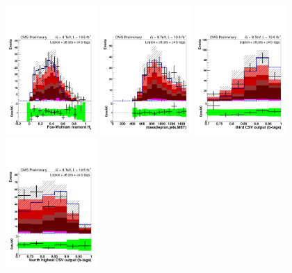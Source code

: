 \begin{figure}[hbtp]
 \begin{center}
   \includegraphics[width=0.31\textwidth]{Figures/Analysis_2_Diagrams/LJ_plots_lep/6j4t/lep_h3_6j4t_cumulative_wRatio_noLegend_lin.pdf}
   \includegraphics[width=0.31\textwidth]{Figures/Analysis_2_Diagrams/LJ_plots_lep/6j4t/lep_invariant_mass_of_everything_6j4t_cumulative_wRatio_noLegend_lin.pdf}
   \includegraphics[width=0.31\textwidth]{Figures/Analysis_2_Diagrams/LJ_plots_lep/6j4t/lep_jet_csv_3_6j4t_cumulative_wRatio_noLegend_lin.pdf}
   \includegraphics[width=0.31\textwidth]{Figures/Analysis_2_Diagrams/LJ_plots_lep/6j4t/lep_jet_csv_4_6j4t_cumulative_wRatio_noLegend_lin.pdf}

\end{center}
\end{figure}
